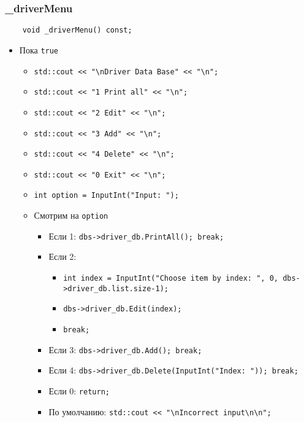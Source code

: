 \subsubsection{\_driverMenu}

\begin{lstlisting}
    void _driverMenu() const;
\end{lstlisting}

\begin{itemize}
    \item Пока \verb|true|
    \begin{itemize}
        \item \verb|std::cout << "\nDriver Data Base" << "\n";|
        \item \verb|std::cout << "1 Print all" << "\n";|
        \item \verb|std::cout << "2 Edit" << "\n";|
        \item \verb|std::cout << "3 Add" << "\n";|
        \item \verb|std::cout << "4 Delete" << "\n";|
        \item \verb|std::cout << "0 Exit" << "\n";|
        \item \verb|int option = InputInt("Input: ");|
        \item Смотрим на \verb|option|
        \begin{itemize}
            \item Если 1: \verb|dbs->driver_db.PrintAll(); break;|
            \item Если 2: 
            \begin{itemize}
                \item \verb|int index = InputInt("Choose item by index: ", 0, dbs->driver_db.list.size-1);|
                \item \verb|dbs->driver_db.Edit(index);|
                \item \verb|break;|
            \end{itemize}
            \item Если 3: \verb|dbs->driver_db.Add(); break;|
            \item Если 4: \verb|dbs->driver_db.Delete(InputInt("Index: ")); break;|
            \item Если 0: \verb|return;|
            \item По умолчанию: \verb|std::cout << "\nIncorrect input\n\n";|
        \end{itemize}
    \end{itemize}
\end{itemize}

